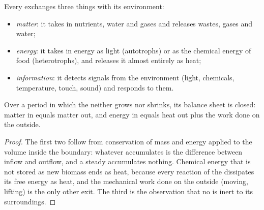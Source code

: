 \begin{proposition}\label{prop:b1:organism-environment:exchanges}
Every  exchanges three things with its environment:
\begin{itemize}
  \item \emph{matter}: it takes in nutrients,
        water and gases and releases wastes, gases and water;
  \item \emph{energy}: it takes in energy as
        light (autotrophs) or as the chemical energy of food
        (heterotrophs), and releases it almost entirely as heat;
  \item \emph{information}: it detects
        signals from the environment (light, chemicals, temperature,
        touch, sound) and responds to them.
\end{itemize}
Over a period in which the  neither grows nor shrinks, its
balance sheet is closed: matter in equals matter out, and energy in
equals heat out plus the work done on the outside.
\end{proposition}
\begin{proof}
The first two follow from conservation of mass and energy applied to the
volume inside the boundary: whatever accumulates is the difference
between inflow and outflow, and a steady  accumulates nothing.
Chemical energy that is not stored as new biomass ends as heat, because
every reaction of the  dissipates its free energy as heat, and
the mechanical work done on the outside (moving, lifting) is the only
other exit. The third is the observation that no  is inert to
its surroundings.
\end{proof}

